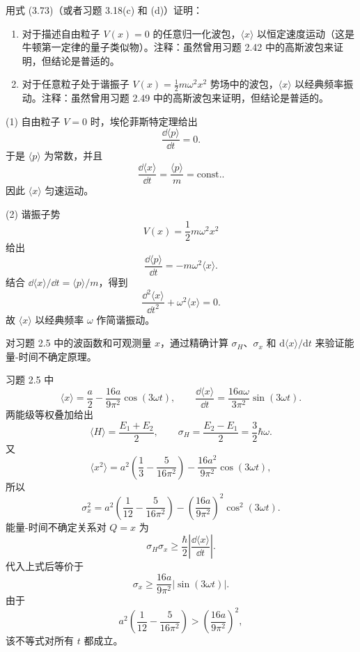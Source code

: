 \begin{question}
用式 (3.73)（或者习题 3.18(c) 和 (d)）证明：
\begin{enumerate}
\item 对于描述自由粒子 $V(x)=0$ 的任意归一化波包，$\langle x\rangle$ 以恒定速度运动（这是牛顿第一定律的量子类似物）。注释：虽然曾用习题 2.42 中的高斯波包来证明，但结论是普适的。
\item 对于任意粒子处于谐振子 $V(x)=\frac12m\omega^2x^2$ 势场中的波包，$\langle x\rangle$ 以经典频率振动。注释：虽然曾用习题 2.49 中的高斯波包来证明，但结论是普适的。
\end{enumerate}

\par\smallskip
{}

\end{question}
\begin{solution}
(1) 自由粒子 $V=0$ 时，埃伦菲斯特定理给出
\[
\frac{\dd\langle p\rangle}{\dd t}=0.
\]
于是 $\langle p\rangle$ 为常数，并且
\[
\frac{\dd\langle x\rangle}{\dd t}=\frac{\langle p\rangle}{m}=\mathrm{const.}.
\]
因此 $\langle x\rangle$ 匀速运动。

(2) 谐振子势
\[
V(x)=\frac12m\omega^2x^2
\]
给出
\[
\frac{\dd\langle p\rangle}{\dd t}=-m\omega^2\langle x\rangle.
\]
结合 $\dd\langle x\rangle/\dd t=\langle p\rangle/m$，得到
\[
\frac{\dd^2\langle x\rangle}{\dd t^2}+\omega^2\langle x\rangle=0.
\]
故 $\langle x\rangle$ 以经典频率 $\omega$ 作简谐振动。
\end{solution}

\begin{question}
对习题 2.5 中的波函数和可观测量 $x$，通过精确计算 $\sigma_H$、$\sigma_x$ 和 $\mathrm d\langle x\rangle/\mathrm dt$ 来验证能量-时间不确定原理。
\end{question}
\begin{solution}
习题 2.5 中
\[
\langle x\rangle=\frac a2-\frac{16a}{9\pi^2}\cos(3\omega t),
\qquad
\frac{\dd\langle x\rangle}{\dd t}=\frac{16a\omega}{3\pi^2}\sin(3\omega t).
\]
两能级等权叠加给出
\[
\langle H\rangle=\frac{E_1+E_2}{2},
\qquad
\sigma_H=\frac{E_2-E_1}{2}=\frac32\hbar\omega.
\]
又
\[
\langle x^2\rangle
=a^2\left(\frac13-\frac{5}{16\pi^2}\right)-\frac{16a^2}{9\pi^2}\cos(3\omega t),
\]
所以
\[
\sigma_x^2
=a^2\left(\frac1{12}-\frac{5}{16\pi^2}\right)
-\left(\frac{16a}{9\pi^2}\right)^2\cos^2(3\omega t).
\]
能量-时间不确定关系对 $Q=x$ 为
\[
\sigma_H\sigma_x\ge \frac{\hbar}{2}\left|\frac{\dd\langle x\rangle}{\dd t}\right|.
\]
代入上式后等价于
\[
\sigma_x\ge \frac{16a}{9\pi^2}|\sin(3\omega t)|.
\]
由于
\[
a^2\left(\frac1{12}-\frac{5}{16\pi^2}\right)
>\left(\frac{16a}{9\pi^2}\right)^2,
\]
该不等式对所有 $t$ 都成立。
\end{solution}

